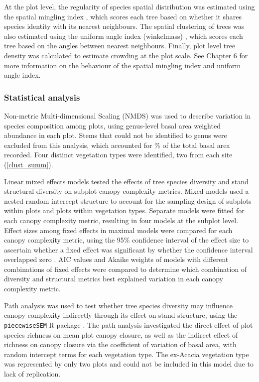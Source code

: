 \documentclass[11pt,a4paper]{article}
\begin{document}
At the plot level, the regularity of species spatial distribution was estimated using the spatial mingling index \citep{Gadow2002}, which scores each tree based on whether it shares species identity with its nearest neighbours. The spatial clustering of trees was also estimated using the uniform angle index (winkelmass) \citep{Gadow2002}, which scores each tree based on the angles between nearest neighbours. Finally, plot level tree density was calculated to estimate crowding at the plot scale. See Chapter 6 for more information on the behaviour of the spatial mingling index and uniform angle index.

\subsubsection{Statistical analysis}

Non-metric Multi-dimensional Scaling (NMDS) was used to describe variation in species composition among plots, using genus-level basal area weighted abundance in each plot. Stems that could not be identified to genus were excluded from this analysis, which accounted for \perIndet{}\% of the total basal area recorded. Four distinct vegetation types were identified, two from each site (\autoref{clust_summ}). 

Linear mixed effects models tested the effects of tree species diversity and stand structural diversity on subplot canopy complexity metrics. Mixed models used a nested random intercept structure to account for the sampling design of subplots within plots and plots within vegetation types. Separate models were fitted for each canopy complexity metric, resulting in four models at the subplot level. Effect sizes among fixed effects in maximal models were compared for each canopy complexity metric, using the 95\% confidence interval of the effect size to ascertain whether a fixed effect was significant by whether the confidence interval overlapped zero \citep{Nakagawa2007}. AIC values and Akaike weights of models with different combinations of fixed effects were compared to determine which combination of diversity and structural metrics best explained variation in each canopy complexity metric. 

Path analysis was used to test whether tree species diversity may influence canopy complexity indirectly through its effect on stand structure, using the \texttt{piecewiseSEM} R package \citep{piecewiseSEM}. The path analysis investigated the direct effect of plot species richness on mean plot canopy closure, as well as the indirect effect of richness on canopy closure via the coefficient of variation of basal area, with random intercept terms for each vegetation type. The ex-Acacia vegetation type was represented by only two plots and could not be included in this model due to lack of replication.
\end{document}
